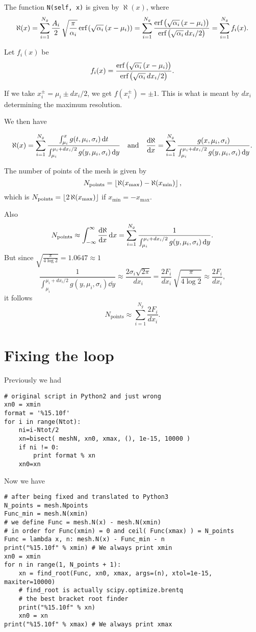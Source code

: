 \documentclass[a4paper,fleqn,12pt]{article}
\begin{document}
The function \texttt{N(self, x)} is given by $\aleph(x)$, where
$$
\aleph(x) = \sum_{i = 1}^{N_g} \frac{A_i}{2} \, \sqrt{\frac{\pi}{\alpha_i}} \,
\text{erf}\left(\sqrt{\alpha_i} \, (x - \mu_i)\right) =
\sum_{i=1}^{N_g}
\frac{\text{erf}\left(\sqrt{\alpha_i} \, (x - \mu_i)\right)}{\text{erf}\left(\sqrt{\alpha_i} \, dx_i / 2\right)} =
\sum_{i = 1}^{N_g} f_i(x).
$$

Let $f_i(x)$ be
$$
f_i(x) = \frac{\text{erf}\left(\sqrt{\alpha_i} \, (x - \mu_i)\right)}
{\text{erf}\left(\sqrt{\alpha_i} \, dx_i / 2\right)}.
$$

If we take $x_i^\pm = \mu_i \pm dx_i/2$, we get $f(x_i^\pm) = \pm 1$. This is what is meant by $dx_i$ determining the maximum resolution.

We then have

$$
\aleph(x) =
\sum_{i=1}^{N_g}
\frac{\int_{\mu_i}^x g(t, \mu_i, \sigma_i) \dd{t}}
{\int_{\mu_i}^{\mu_i + dx_i/2} g(y, \mu_i, \sigma_i) \dd{y}}
\quad \text{and} \quad
\dv{\aleph}{x} =
\sum_{i=1}^{N_g}
\frac{g(x, \mu_i, \sigma_i)}
{\int_{\mu_i}^{\mu_i + dx_i/2} g(y, \mu_i, \sigma_i) \dd{y}}.
$$

The number of points of the mesh is given by
$$
N_{\text{points}} = \left\lfloor \aleph(x_{\text{max}}) - \aleph(x_{\text{min}}) \right\rfloor,
$$
which is $N_{\text{points}} = \left\lfloor 2 \, \aleph(x_{\text{max}}) \right\rfloor$ if $x_{\text{min}} = - x_{\text{max}}$.

Also
$$
N_{\text{points}} \approx
\int_{-\infty}^{\infty} \dv{\aleph}{x} \dd{x} =
\sum_{i=1}^{N_g} \frac{1}
{\int_{\mu_i}^{\mu_i + dx_i/2} g(y, \mu_i, \sigma_i) \dd{y}}.
$$
But since $\sqrt{\frac{\pi}{4\log 2}} = 1.0647 \approx 1$
$$
\frac{1}{\int_{\mu_i}^{\mu_i + dx_i/2} g(y, \mu_i, \sigma_i) \dd{y}}
\approx \frac{2 \sigma_i \sqrt{2\pi}}{dx_i} =
\frac{2 F_i}{dx_i} \, \sqrt{\frac{\pi}{4\log 2}} \approx \frac{2 F_i}{dx_i},
$$
it follows
$$
\boxed{
N_{\text{points}} \approx \sum_{i=1}^{N_g} \frac{2 F_i}{dx_i}. }
$$

\section{Fixing the loop}

Previously we had
\begin{verbatim}
# original script in Python2 and just wrong
xn0 = xmin
format = '%15.10f'
for i in range(Ntot):
    ni=i-Ntot/2
    xn=bisect( meshN, xn0, xmax, (), 1e-15, 10000 )
    if ni != 0:
        print format % xn
    xn0=xn
\end{verbatim}

Now we have
\begin{verbatim}
# after being fixed and translated to Python3
N_points = mesh.Npoints
Func_min = mesh.N(xmin)
# we define Func = mesh.N(x) - mesh.N(xmin)
# in order for Func(xmin) = 0 and ceil( Func(xmax) ) = N_points
Func = lambda x, n: mesh.N(x) - Func_min - n
print("%15.10f" % xmin) # We always print xmin
xn0 = xmin
for n in range(1, N_points + 1):
    xn = find_root(Func, xn0, xmax, args=(n), xtol=1e-15, maxiter=10000)
    # find_root is actually scipy.optimize.brentq
    # the best bracket root finder
    print("%15.10f" % xn)
    xn0 = xn
print("%15.10f" % xmax) # We always print xmax
\end{verbatim}
\end{document}
